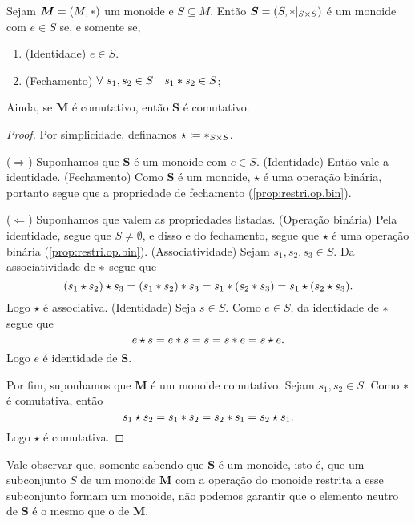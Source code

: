 \begin{prop}
\label{alge:prop.submon}
Sejam $\bm M=(M, \ast )$ um monoide e $S \subseteq M$. Então $\bm S=(S, \ast |_{S \times S})$ é um monoide com $e \in S$ se, e somente se,
	\begin{enumerate}
	\item (Identidade) $e \in S$.
	\item (Fechamento) $\forall\ s_1,s_2 \in S \quad s_1 \ast s_2 \in S$;
	\end{enumerate}
\noindent
Ainda, se $\bm M$ é comutativo, então $\bm S$ é comutativo.
\end{prop}
\begin{proof} Por simplicidade, definamos $\star \coloneqq  \ast _{S \times S}$.

($\Rightarrow$) Suponhamos que $\bm S$ é um monoide com $e \in S$. (Identidade) Então vale a identidade. (Fechamento) Como $\bm S$ é um monoide, $\star$ é uma operação binária, portanto segue que a propriedade de fechamento (\ref{prop:restri.op.bin}).

($\Leftarrow$) Suponhamos que valem as propriedades listadas. (Operação binária) Pela identidade, segue que $S \neq \emptyset$, e disso e do fechamento, segue que $\star$ é uma operação binária (\ref{prop:restri.op.bin}).
(Associatividade) Sejam $s_1,s_2,s_3 \in S$. Da associatividade de $ \ast $ segue que
	\begin{equation*}
	 (s_1 \star s_2) \star s_3 = (s_1  \ast  s_2)  \ast  s_3 = s_1  \ast  (s_2  \ast  s_3) = s_1 \star (s_2 \star s_3).
	 \end{equation*}
Logo $\star$ é associativa. (Identidade) Seja $s \in S$. Como $e \in S$, da identidade de $ \ast $ segue que
	\begin{equation*}
	e \star s = e  \ast  s = s = s \ast  e = s \star e.
	\end{equation*}
Logo $e$ é identidade de $\bm S$.

Por fim, suponhamos que $\bm M$ é um monoide comutativo. Sejam $s_1,s_2 \in S$. Como $ \ast $ é comutativa, então
	\begin{equation*}
	s_1 \star s_2 = s_1  \ast  s_2 = s_2  \ast  s_1 = s_2 \star s_1.
	\end{equation*}
Logo $\star$ é comutativa.
\end{proof}

Vale observar que, somente sabendo que $\bm S$ é um monoide, isto é, que um subconjunto $S$ de um monoide $\bm M$ com a operação do monoide restrita a esse subconjunto formam um monoide, não podemos garantir que o elemento neutro de $\bm S$ é o mesmo que o de $\bm M$.

